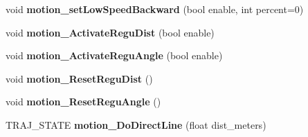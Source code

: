 \begin{DoxyCompactItemize}
void {\bfseries motion\+\_\+set\+Low\+Speed\+Backward} (bool enable, int percent=0)
\item 
\mbox{\label{classAsservDriver_a48e4f69bf857d6a18098dc48615a61f1}} 
void {\bfseries motion\+\_\+\+Activate\+Regu\+Dist} (bool enable)
\item 
\mbox{\label{classAsservDriver_a846608b8033f7d592d2540b68de72eeb}} 
void {\bfseries motion\+\_\+\+Activate\+Regu\+Angle} (bool enable)
\item 
\mbox{\label{classAsservDriver_acb84d282c7e0b40d9b326b0fcb7a0c69}} 
void {\bfseries motion\+\_\+\+Reset\+Regu\+Dist} ()
\item 
\mbox{\label{classAsservDriver_acd102376cacdf0fc40a587f25359a25e}} 
void {\bfseries motion\+\_\+\+Reset\+Regu\+Angle} ()
\item 
\mbox{\label{classAsservDriver_a27f3a8fa56cc689d072a39efb1ed20b3}} 
T\+R\+A\+J\+\_\+\+S\+T\+A\+TE {\bfseries motion\+\_\+\+Do\+Direct\+Line} (float dist\+\_\+meters)
\end{DoxyCompactItemize}
